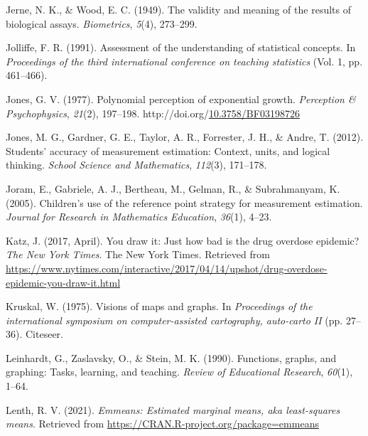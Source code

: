 \documentclass[print]{nuthesis}
\newlength{\cslhangindent}
\newenvironment{CSLReferences}[2]%
{\setlength{\parindent}{0pt}%
\everypar{\setlength{\hangindent}{\cslhangindent}}\ignorespaces}%
{\par}
\begin{document}
\begin{CSLReferences}{1}{0}
\leavevmode{}%
Jerne, N. K., \& Wood, E. C. (1949). The validity and meaning of the results of biological assays. \emph{Biometrics}, \emph{5}(4), 273--299.

\leavevmode{}%
Jolliffe, F. R. (1991). Assessment of the understanding of statistical concepts. In \emph{Proceedings of the third international conference on teaching statistics} (Vol. 1, pp. 461--466).

\leavevmode{}%
Jones, G. V. (1977). Polynomial perception of exponential growth. \emph{Perception \& Psychophysics}, \emph{21}(2), 197--198. http://doi.org/\href{https://doi.org/10.3758/BF03198726}{10.3758/BF03198726}

\leavevmode{}%
Jones, M. G., Gardner, G. E., Taylor, A. R., Forrester, J. H., \& Andre, T. (2012). Students' accuracy of measurement estimation: Context, units, and logical thinking. \emph{School Science and Mathematics}, \emph{112}(3), 171--178.

\leavevmode{}%
Joram, E., Gabriele, A. J., Bertheau, M., Gelman, R., \& Subrahmanyam, K. (2005). Children's use of the reference point strategy for measurement estimation. \emph{Journal for Research in Mathematics Education}, \emph{36}(1), 4--23.

\leavevmode{}%
Katz, J. (2017, April). You draw it: Just how bad is the drug overdose epidemic? \emph{The New York Times}. The New York Times. Retrieved from \url{https://www.nytimes.com/interactive/2017/04/14/upshot/drug-overdose-epidemic-you-draw-it.html}

\leavevmode{}%
Kruskal, W. (1975). Visions of maps and graphs. In \emph{Proceedings of the international symposium on computer-assisted cartography, auto-carto II} (pp. 27--36). Citeseer.

\leavevmode{}%
Leinhardt, G., Zaslavsky, O., \& Stein, M. K. (1990). Functions, graphs, and graphing: Tasks, learning, and teaching. \emph{Review of Educational Research}, \emph{60}(1), 1--64.

\leavevmode{}%
Lenth, R. V. (2021). \emph{Emmeans: Estimated marginal means, aka least-squares means}. Retrieved from \url{https://CRAN.R-project.org/package=emmeans}


\end{CSLReferences}
\end{document}
